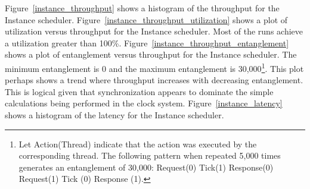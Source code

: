 Figure~\ref{instance_throughput} shows a histogram of the throughput for the Instance scheduler.
Figure~\ref{instance_throughput_utilization} shows a plot of utilization versus throughput for the Instance scheduler.
Most of the runs achieve a utilization greater than 100\%.
Figure~\ref{instance_throughput_entanglement} shows a plot of entanglement versus throughput for the Instance scheduler.
The minimum entanglement is 0 and the maximum entanglement is 30,000\footnote{Let Action(Thread) indicate that the action was executed by the corresponding thread.  The following pattern when repeated 5,000 times generates an entanglement of 30,000:  Request(0) Tick(1) Response(0) Request(1) Tick (0) Response (1).}.
This plot perhaps shows a trend where throughput increases with decreasing entanglement.
This is logical given that synchronization appears to dominate the simple calculations being performed in the clock system.
Figure~\ref{instance_latency} shows a histogram of the latency for the Instance scheduler.

